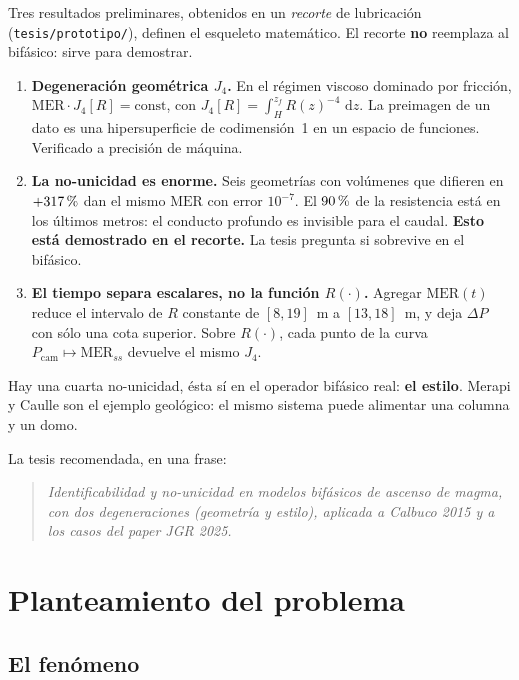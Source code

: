 \documentclass[11pt,a4paper]{article}
\theoremstyle{plain}
\theoremstyle{definition}
\theoremstyle{remark}
\newcommand{\pc}{\ifmmode\text{\,\%}\else\,\%\fi}
\newcommand{\MER}{\mathrm{MER}}
\newcommand{\dd}{\,\mathrm{d}}
\begin{document}
Tres resultados preliminares, obtenidos en un \emph{recorte} de
lubricación (\texttt{tesis/prototipo/}), definen el esqueleto
matemático. El recorte \textbf{no} reemplaza al bifásico: sirve para
demostrar.

\begin{enumerate}
\item \textbf{Degeneración geométrica $J_4$.}
  En el régimen viscoso dominado por fricción,
  $\MER\cdot J_4[R]=\mathrm{const}$, con
  $J_4[R]=\int_H^{z_f}R(z)^{-4}\,\dd z$.
  La preimagen de un dato es una hipersuperficie de codimensión~1 en
  un espacio de funciones. Verificado a precisión de máquina.
\item \textbf{La no-unicidad es enorme.}
  Seis geometrías con volúmenes que difieren en $+317\pc$ dan el mismo
  $\MER$ con error $10^{-7}$. El $90\pc$ de la resistencia está en los
  últimos metros: el conducto profundo es invisible para el caudal.
  \textbf{Esto está demostrado en el recorte.} La tesis pregunta si
  sobrevive en el bifásico.
\item \textbf{El tiempo separa escalares, no la función $R(\cdot)$.}
  Agregar $\MER(t)$ reduce el intervalo de $R$ constante de
  $[8,19]$~m a $[13,18]$~m, y deja $\Delta P$ con sólo una cota
  superior. Sobre $R(\cdot)$, cada punto de la curva
  $P_{\mathrm{cam}}\mapsto\MER_{ss}$ devuelve el mismo $J_4$.
\end{enumerate}

Hay una cuarta no-unicidad, ésta sí en el operador bifásico real:
\textbf{el estilo}. Merapi y Caulle son el ejemplo geológico: el
mismo sistema puede alimentar una columna y un domo.

La tesis recomendada, en una frase:

\begin{quote}
\textit{Identificabilidad y no-unicidad en modelos bifásicos de
ascenso de magma, con dos degeneraciones (geometría y estilo),
aplicada a Calbuco 2015 y a los casos del paper JGR 2025.}
\end{quote}

\section{Planteamiento del problema}
\label{sec:planteamiento}

\subsection{El fenómeno}
\end{document}
